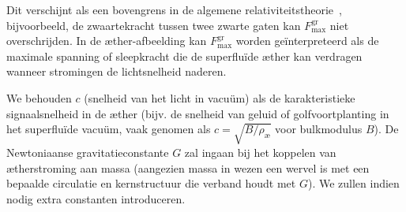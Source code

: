 Dit verschijnt als een bovengrens in de algemene relativiteitstheorie~\cite{Schiller2022-maxforce}, bijvoorbeeld, de zwaartekracht tussen twee zwarte gaten kan $F^{\text{gr}}_{\text{max}}$ niet overschrijden. In de æther-afbeelding kan $F^{\text{gr}}_{\text{max}}$ worden geïnterpreteerd als de maximale spanning of sleepkracht die de superfluïde æther kan verdragen wanneer stromingen de lichtsnelheid naderen.

We behouden $c$ (snelheid van het licht in vacuüm) als de karakteristieke signaalsnelheid in de æther (bijv. de snelheid van geluid of golfvoortplanting in het superfluïde vacuüm, vaak genomen als $c = \sqrt{B/\rho_\text{\ae}}$ voor bulkmodulus $B$). De Newtoniaanse gravitatieconstante $G$ zal ingaan bij het koppelen van ætherstroming aan massa (aangezien massa in wezen een wervel is met een bepaalde circulatie en kernstructuur die verband houdt met $G$). We zullen indien nodig extra constanten introduceren.
